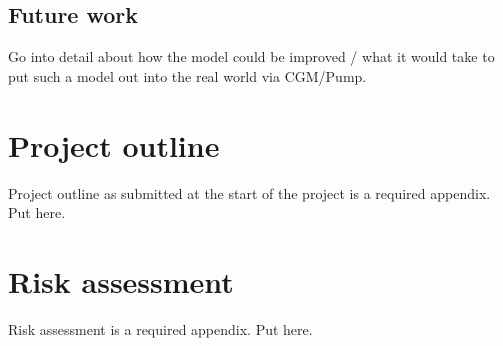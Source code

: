 	\subsection{Future work}
        Go into detail about how the model could be improved / what it would take to put such a model out into the real world via CGM/Pump.
    


\printbibliography[title={References},heading=bibintoc] %



\begin{uomappendix} 
    \section{Project outline}
    Project outline as submitted at the start of the project is a required appendix. Put here. 
    
    \section{Risk assessment}
    Risk assessment is a required appendix. Put here.

\end{uomappendix}


